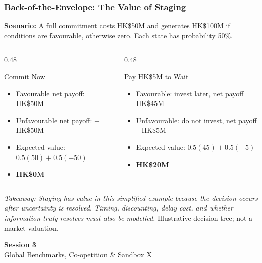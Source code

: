\documentclass{beamer}
\begin{document}
\begin{frame}[t,shrink=13]
\frametitle{Back-of-the-Envelope: The Value of Staging}
\textbf{Scenario:} A full commitment costs HK\$50M and generates HK\$100M if conditions are favourable, otherwise zero. Each state has probability 50\%.
\begin{columns}[T]
\begin{column}{0.48\textwidth}\begin{block}{Commit Now}
\begin{itemize}
\item Favourable net payoff: HK\$50M
\item Unfavourable net payoff: $-$HK\$50M
\item Expected value: $0.5(50)+0.5(-50)$
\item \textbf{HK\$0M}
\end{itemize}\end{block}\end{column}
\begin{column}{0.48\textwidth}\begin{block}{Pay HK\$5M to Wait}
\begin{itemize}
\item Favourable: invest later, net payoff HK\$45M
\item Unfavourable: do not invest, net payoff $-$HK\$5M
\item Expected value: $0.5(45)+0.5(-5)$
\item \textbf{HK\$20M}
\end{itemize}\end{block}\end{column}
\end{columns}
\textit{Takeaway: Staging has value in this simplified example because the decision occurs after uncertainty is resolved. Timing, discounting, delay cost, and whether information truly resolves must also be modelled.}
\vfill{\tiny Illustrative decision tree; not a market valuation.}
\end{frame}

\begin{frame}[c]
  \begin{center}
    \huge\color{cuhkpurple}\textbf{Session 3}\\
    \vspace{0.5cm}
    \Large Global Benchmarks, Co-opetition \& Sandbox X
  \end{center}
\end{frame}
\end{document}
